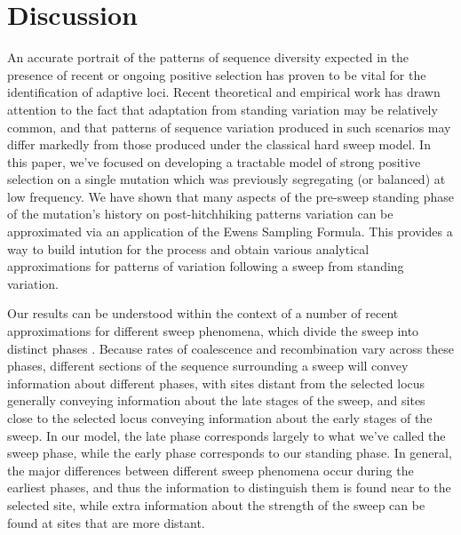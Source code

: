 \documentclass[a4paper,10pt]{article}
\newcommand{\gc}[1]{{\it \color{red} (#1)} }
\begin{document}
%
%
%
%
%

\section*{Discussion}

An accurate portrait of the patterns of sequence diversity expected in the presence of recent or ongoing positive selection has proven to be vital for the identification of adaptive loci. Recent theoretical and empirical work has drawn attention to the fact that adaptation from standing variation may be relatively common, and that patterns of sequence variation produced in such scenarios may differ markedly from those produced under the classical hard sweep model. In this paper, we've focused on developing a tractable model of strong positive selection on a single mutation which was previously segregating (or balanced) at low frequency. We have shown that many aspects of the pre-sweep standing phase of the mutation's history on post-hitchhiking patterns variation can be approximated via an application of the Ewens Sampling Formula. This provides a way to build intution for the process and obtain various analytical approximations for patterns of variation following a sweep from standing variation. 

Our results can be understood within the context of a number of recent approximations for different sweep phenomena, which divide the sweep into distinct phases \citep[see e.g.][]{Barton1998,Etheridge:2006fk}. Because rates of coalescence and recombination vary across these phases, different sections of the sequence surrounding a sweep will convey information about different phases, with sites distant from the selected locus generally conveying information about the late stages of the sweep, and sites close to the selected locus conveying information about the early stages of the sweep. In our model, the late phase corresponds largely to what we've called the sweep phase, while the early phase corresponds to our standing phase. In general, the major differences between different sweep phenomena occur during the earliest phases, and thus the information to distinguish them is found near to the selected site, while extra information about the strength of the sweep can be found at sites that are more distant.
\end{document}

